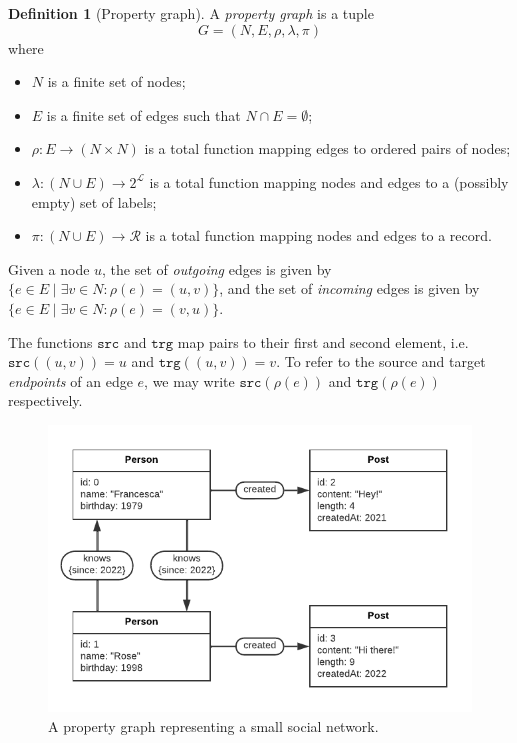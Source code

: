 \documentclass{article}
\theoremstyle{definition}
\newtheorem{definition}{Definition}
\newcommand{\src}{\mathtt{src}}
\newcommand{\trg}{\mathtt{trg}}
\begin{document}
\begin{definition}[Property graph]
  \label{def:pg}
  A \emph{property graph} is a tuple $$G = (N, E, \rho, \lambda, \pi)$$ where
  \begin{itemize}
    \item $N$ is a finite set of nodes;
    \item $E$ is a finite set of edges such that $N \cap E = \emptyset$;
    \item $\rho : E \to (N \times N)$ is a total function mapping edges to ordered pairs of nodes;
    \item $\lambda : (N \cup E) \to 2^{\mathcal{L}}$ is a total function mapping nodes and edges to a (possibly empty) set of labels;
    \item $\pi : (N \cup E) \to \mathcal{R}$ is a total function mapping nodes and edges to a record.
  \end{itemize}
\end{definition}

Given a node $u$, the set of \emph{outgoing} edges is given by $\{e \in E \mid \exists v \in N : \rho(e) = (u, v)\}$, and the set of \emph{incoming} edges is given by $\{e \in E \mid \exists v \in N : \rho(e) = (v, u)\}$.

The functions $\src$ and $\trg$ map pairs to their first and second element, i.e. $\src((u, v)) = u$ and $\trg((u, v)) = v$. To refer to the source and target \emph{endpoints} of an edge $e$, we may write $\src(\rho(e))$ and $\trg(\rho(e))$ respectively.

\begin{figure}[t]
  \centering
  \includegraphics{figures/pg.pdf}
  \caption{A property graph representing a small social network.}
  \label{fig:pg}
\end{figure}
\end{document}
